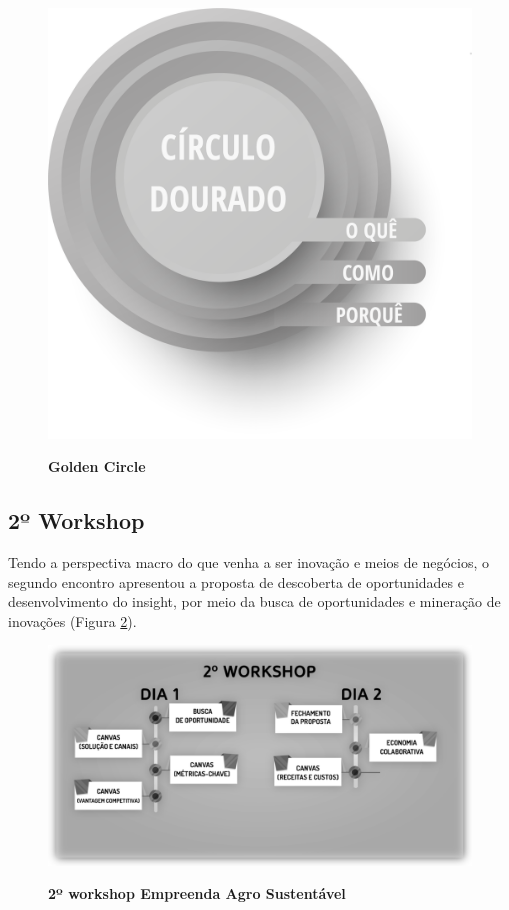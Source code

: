 \begin{figure}[H]
\centering
\caption{\textbf{Golden Circle}}
\includegraphics[scale=0.25]{Imagens/circulo_dourado.png}
\label{figura_5}
\end{figure}

\subsection{2º Workshop}

Tendo a perspectiva macro do que venha a ser inovação e meios de negócios, o segundo encontro apresentou a proposta de descoberta de oportunidades e desenvolvimento do insight, por meio da busca de oportunidades e mineração de inovações (Figura \ref{figura_31}).





\begin{figure}[H]
\centering
\caption{\textbf{2º workshop Empreenda Agro Sustentável}}
\includegraphics[scale=0.3]{Imagens/workshop-02.png}
\label{figura_31}
\end{figure}

